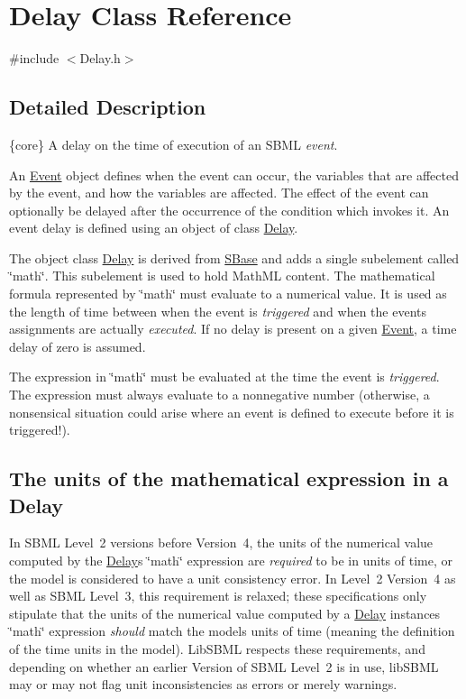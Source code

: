 \hypertarget{class_delay}{}\section{Delay Class Reference}
\label{class_delay}


{\ttfamily \#include $<$Delay.\+h$>$}



\subsection{Detailed Description}
\{core\} A delay on the time of execution of an S\+B\+ML {\itshape event}.

An \hyperlink{class_event}{Event} object defines when the event can occur, the variables that are affected by the event, and how the variables are affected. The effect of the event can optionally be delayed after the occurrence of the condition which invokes it. An event delay is defined using an object of class \hyperlink{class_delay}{Delay}.

The object class \hyperlink{class_delay}{Delay} is derived from \hyperlink{class_s_base}{S\+Base} and adds a single subelement called \char`\"{}math\char`\"{}. This subelement is used to hold Math\+ML content. The mathematical formula represented by \char`\"{}math\char`\"{} must evaluate to a numerical value. It is used as the length of time between when the event is {\itshape triggered} and when the event\textquotesingle{}s assignments are actually {\itshape executed}. If no delay is present on a given \hyperlink{class_event}{Event}, a time delay of zero is assumed.

The expression in \char`\"{}math\char`\"{} must be evaluated at the time the event is {\itshape triggered}. The expression must always evaluate to a nonnegative number (otherwise, a nonsensical situation could arise where an event is defined to execute before it is triggered!).\hypertarget{class_delay_delay-units}{}\subsection{The units of the mathematical expression in a Delay}\label{class_delay_delay-units}
In S\+B\+ML Level~2 versions before Version~4, the units of the numerical value computed by the \hyperlink{class_delay}{Delay}\textquotesingle{}s \char`\"{}math\char`\"{} expression are {\itshape required} to be in units of time, or the model is considered to have a unit consistency error. In Level~2 Version~4 as well as S\+B\+ML Level~3, this requirement is relaxed; these specifications only stipulate that the units of the numerical value computed by a \hyperlink{class_delay}{Delay} instance\textquotesingle{}s \char`\"{}math\char`\"{} expression {\itshape should} match the model\textquotesingle{}s units of time (meaning the definition of the {\ttfamily time} units in the model). Lib\+S\+B\+ML respects these requirements, and depending on whether an earlier Version of S\+B\+ML Level~2 is in use, lib\+S\+B\+ML may or may not flag unit inconsistencies as errors or merely warnings.

